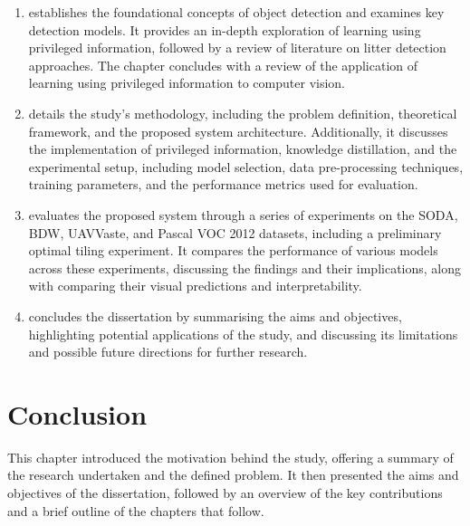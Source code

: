 \begin{enumerate}[label=\textbf{Chapter \arabic*}, leftmargin=*, start=2]
    

    \item establishes the foundational concepts of object detection and examines key detection models. It provides an in-depth exploration of learning using privileged information, followed by a review of literature on litter detection approaches. The chapter concludes with a review of the application of learning using privileged information to computer vision.
    
    \item details the study's methodology, including the problem definition, theoretical framework, and the proposed system architecture. Additionally, it discusses the implementation of privileged information, knowledge distillation, and the experimental setup, including model selection, data pre-processing techniques, training parameters, and the performance metrics used for evaluation.
    
    \item evaluates the proposed system through a series of experiments on the SODA, BDW, UAVVaste, and Pascal VOC 2012 datasets, including a preliminary optimal tiling experiment. It compares the performance of various models across these experiments, discussing the findings and their implications, along with comparing their visual predictions and interpretability.
    

    \item concludes the dissertation by summarising the aims and objectives, highlighting potential applications of the study, and discussing its limitations and possible future directions for further research.
\end{enumerate}

\section{Conclusion}
\label{sec:conclusion_intro}

This chapter introduced the motivation behind the study, offering a summary of the research undertaken and the defined problem. It then presented the aims and objectives of the dissertation, followed by an overview of the key contributions and a brief outline of the chapters that follow.

